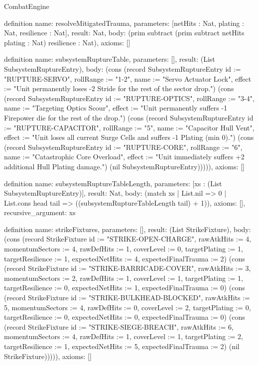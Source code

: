 \begin{lexlean}{CombatEngine}
\begin{semanticmodule}
definition{
  name: resolveMitigatedTrauma,
  parameters: [netHits : Nat, plating : Nat, resilience : Nat],
  result: Nat,
  body: (prim subtract (prim subtract netHits plating : Nat) resilience : Nat),
  axioms: []
}

definition{
  name: subsystemRuptureTable,
  parameters: [],
  result: (List SubsystemRuptureEntry),
  body: (cons (record SubsystemRuptureEntry {id := "RUPTURE-SERVO", rollRange := "1-2", name := "Servo Actuator Lock", effect := "Unit permanently loses -2 Stride for the rest of the sector drop."}) (cons (record SubsystemRuptureEntry {id := "RUPTURE-OPTICS", rollRange := "3-4", name := "Targeting Optics Scour", effect := "Unit permanently suffers -1 Firepower die for the rest of the drop."}) (cons (record SubsystemRuptureEntry {id := "RUPTURE-CAPACITOR", rollRange := "5", name := "Capacitor Hull Vent", effect := "Unit loses all current Surge Cells and suffers -1 Plating (min 0)."}) (cons (record SubsystemRuptureEntry {id := "RUPTURE-CORE", rollRange := "6", name := "Catastrophic Core Overload", effect := "Unit immediately suffers +2 additional Hull Plating damage."}) (nil SubsystemRuptureEntry))))),
  axioms: []
}

definition{
  name: subsystemRuptureTableLength,
  parameters: [xs : (List SubsystemRuptureEntry)],
  result: Nat,
  body: (match xs
    | List.nil => 0
    | List.cons head tail => ((subsystemRuptureTableLength tail) + 1)),
  axioms: [],
  recursive_argument: xs
}

definition{
  name: strikeFixtures,
  parameters: [],
  result: (List StrikeFixture),
  body: (cons (record StrikeFixture {id := "STRIKE-OPEN-CHARGE", rawAtkHits := 4, momentumSectors := 4, rawDefHits := 1, coverLevel := 0, targetPlating := 1, targetResilience := 1, expectedNetHits := 4, expectedFinalTrauma := 2}) (cons (record StrikeFixture {id := "STRIKE-BARRICADE-COVER", rawAtkHits := 3, momentumSectors := 2, rawDefHits := 1, coverLevel := 1, targetPlating := 1, targetResilience := 0, expectedNetHits := 1, expectedFinalTrauma := 0}) (cons (record StrikeFixture {id := "STRIKE-BULKHEAD-BLOCKED", rawAtkHits := 5, momentumSectors := 4, rawDefHits := 0, coverLevel := 2, targetPlating := 0, targetResilience := 0, expectedNetHits := 0, expectedFinalTrauma := 0}) (cons (record StrikeFixture {id := "STRIKE-SIEGE-BREACH", rawAtkHits := 6, momentumSectors := 4, rawDefHits := 1, coverLevel := 1, targetPlating := 2, targetResilience := 1, expectedNetHits := 5, expectedFinalTrauma := 2}) (nil StrikeFixture))))),
  axioms: []
}


\end{semanticmodule}
\end{lexlean}
